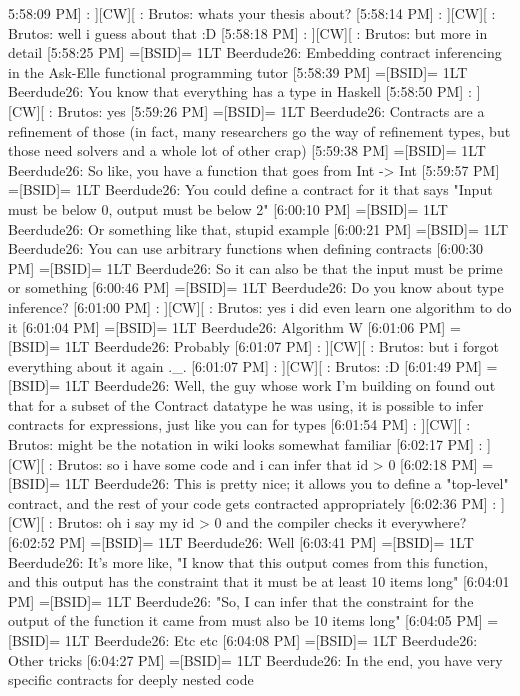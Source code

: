 \documentclass[10pt,a4paper]{article}
\begin{document}
5:58:09 PM] : ][CW][ : Brutos: whats your thesis about?
[5:58:14 PM] : ][CW][ : Brutos: well i guess about that :D
[5:58:18 PM] : ][CW][ : Brutos: but more in detail
[5:58:25 PM] =[BSID]= 1LT Beerdude26: Embedding contract inferencing in the Ask-Elle functional programming tutor
[5:58:39 PM] =[BSID]= 1LT Beerdude26: You know that everything has a type in Haskell
[5:58:50 PM] : ][CW][ : Brutos: yes
[5:59:26 PM] =[BSID]= 1LT Beerdude26: Contracts are a refinement of those (in fact, many researchers go the way of refinement types, but those need solvers and a whole lot of other crap)
[5:59:38 PM] =[BSID]= 1LT Beerdude26: So like, you have a function that goes from Int -> Int
[5:59:57 PM] =[BSID]= 1LT Beerdude26: You could define a contract for it that says "Input must be below 0, output must be below 2"
[6:00:10 PM] =[BSID]= 1LT Beerdude26: Or something like that, stupid example
[6:00:21 PM] =[BSID]= 1LT Beerdude26: You can use arbitrary functions when defining contracts
[6:00:30 PM] =[BSID]= 1LT Beerdude26: So it can also be that the input must be prime or something
[6:00:46 PM] =[BSID]= 1LT Beerdude26: Do you know about type inference?
[6:01:00 PM] : ][CW][ : Brutos: yes i did even learn one algorithm to do it
[6:01:04 PM] =[BSID]= 1LT Beerdude26: Algorithm W
[6:01:06 PM] =[BSID]= 1LT Beerdude26: Probably
[6:01:07 PM] : ][CW][ : Brutos: but i forgot everything about it again ._.
[6:01:07 PM] : ][CW][ : Brutos: :D
[6:01:49 PM] =[BSID]= 1LT Beerdude26: Well, the guy whose work I'm building on found out that for a subset of the Contract datatype he was using, it is possible to infer contracts for expressions, just like you can for types
[6:01:54 PM] : ][CW][ : Brutos: might be the notation in wiki looks somewhat familiar
[6:02:17 PM] : ][CW][ : Brutos: so i have some code and i can infer that id > 0
[6:02:18 PM] =[BSID]= 1LT Beerdude26: This is pretty nice; it allows you to define a "top-level" contract, and the rest of your code gets contracted appropriately
[6:02:36 PM] : ][CW][ : Brutos: oh i say my id > 0 and the compiler checks it everywhere?
[6:02:52 PM] =[BSID]= 1LT Beerdude26: Well
[6:03:41 PM] =[BSID]= 1LT Beerdude26: It's more like, "I know that this output comes from this function, and this output has the constraint that it must be at least 10 items long"
[6:04:01 PM] =[BSID]= 1LT Beerdude26: "So, I can infer that the constraint for the output of the function it came from must also be 10 items long"
[6:04:05 PM] =[BSID]= 1LT Beerdude26: Etc etc
[6:04:08 PM] =[BSID]= 1LT Beerdude26: Other tricks
[6:04:27 PM] =[BSID]= 1LT Beerdude26: In the end, you have very specific contracts for deeply nested code
\end{document}
